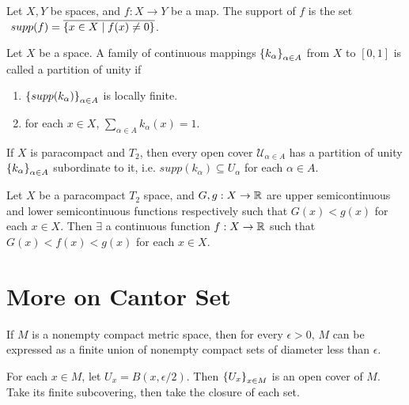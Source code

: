 \begin{df}
    Let $X, Y$ be spaces, and $f: X\to Y$ be a map. The support of $f$ is the set $~supp (f) = \overline{{\left\{{x\in X \mid f(x) \neq 0}\right\}}}$.
\end{df}

\begin{df}
    Let $X$ be a space. A family of continuous mappings ${\left\{{k_\alpha}\right\}}_{\alpha\in A}$ from $X$ to $[0, 1]$ is called a partition of unity if
    \begin{enumerate}[label={(\roman*)}]
        \item ${\left\{{supp(k_\alpha)}\right\}}_{\alpha\in A}$ is locally finite.
        \item for each $x\in X$, $\sum_{\alpha\in A} k_\alpha(x) = 1$.
    \end{enumerate}
\end{df}

\begin{thm}
    If $X$ is paracompact and $T_2$, then every open cover $\mathcal U_{\alpha\in A}$ has a partition of unity ${\left\{{k_\alpha}\right\}}_{\alpha\in A}$ subordinate to it, i.e. $supp(k_\alpha) \subseteq U_\alpha$ for each $\alpha\in A$.
\end{thm}

\begin{prop}
    Let $X$ be a paracompact $T_2$ space, and $G, g: X \to {\mathbb R}$ are upper semicontinuous and lower semicontinuous functions respectively such that $G(x) < g(x)$ for each $x\in X$. Then $\exists$ a continuous function $f: X\to {\mathbb R}$ such that $G(x) < f(x) < g(x)$ for each $x\in X$.
\end{prop}

\section{More on Cantor Set}

\begin{lm}
    \label{lm:more-on-cantor-1}
    If $M$ is a nonempty compact metric space, then for every $\epsilon > 0$, $M$ can be expressed as a finite union of nonempty compact sets of diameter less than $\epsilon$.
    \begin{pf}
        For each $x\in M$, let $U_x = B(x, \epsilon/2)$. Then ${\left\{{U_x}\right\}}_{x\in M}$ is an open cover of $M$. Take its finite subcovering, then take the closure of each set.
    \end{pf}
\end{lm}

